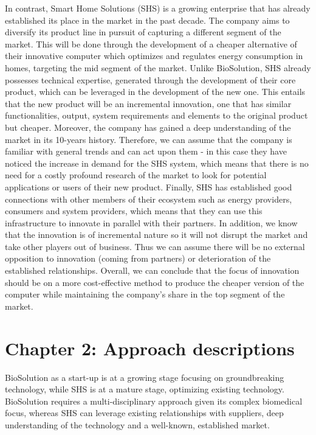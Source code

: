 \documentclass[a4paper,10pt,UTF8]{scrartcl}
\begin{document}
In contrast, Smart Home Solutions (SHS) is a growing enterprise that has already established its place in the market in the past decade. The company aims to diversify its product line in pursuit of capturing a different segment of the market. This will be done through the development of a cheaper alternative of their innovative computer which optimizes and regulates energy consumption in homes, targeting the mid segment of the market. Unlike BioSolution, SHS already possesses technical expertise, generated through the development of their core product, which can be leveraged in the development of the new one. This entails that the new product will be an incremental innovation, one that has similar functionalities, output, system requirements and elements to the original product but cheaper. Moreover, the company has gained a deep understanding of the market in its 10-years history. Therefore, we can assume that the company is familiar with general trends and can act upon them - in this case they have noticed the increase in demand for the SHS system, which means that there is no need for a costly profound research of the market to look for potential applications or users of their new product. Finally, SHS has established good connections with other members of their ecosystem such as energy providers, consumers and system providers, which means that they can use this infrastructure to innovate in parallel with their partners. In addition, we know that the innovation is of incremental nature so it will not disrupt the market and take other players out of business. Thus we can assume there will be no external opposition to innovation (coming from partners) or deterioration of the established relationships. Overall, we can conclude that the focus of innovation should be on a more cost-effective method to produce the cheaper version of the computer while maintaining the company’s share in the top segment of the market. 



\section{Chapter 2: Approach descriptions}
BioSolution as a start-up is at a growing stage focusing on groundbreaking technology, while SHS is at a mature stage, optimizing existing technology. BioSolution requires a multi-disciplinary approach given its complex biomedical focus, whereas SHS can leverage existing relationships with suppliers, deep understanding of the technology and a well-known, established market. 
\end{document}
